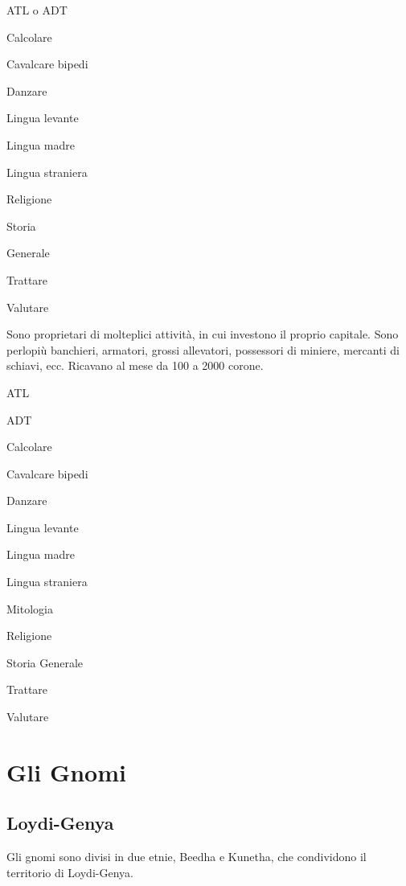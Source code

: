 \begin{abilist}
\item ATL o ADT
\item Calcolare
\item Cavalcare bipedi
\item Danzare
\item Lingua levante
\item Lingua madre
\item Lingua straniera
\item Religione
\item Storia
\item Generale
\item Trattare
\item Valutare
\end{abilist}


Sono proprietari di molteplici attivit\`a, in cui investono il proprio
capitale. Sono perlopi\`u banchieri, armatori, grossi allevatori,
possessori di miniere, mercanti di schiavi, ecc.  Ricavano al mese da
100 a 2000 corone.

\begin{abilist}
\item ATL
\item ADT
\item Calcolare
\item Cavalcare bipedi
\item Danzare
\item Lingua levante
\item Lingua madre
\item Lingua straniera
\item Mitologia
\item Religione
\item Storia Generale
\item Trattare  
\item Valutare
\end{abilist}

\section{Gli Gnomi}

\subsection{Loydi-Genya}


Gli gnomi sono divisi in due etnie, Beedha e
Kunetha, che condividono il territorio di Loydi-Genya.


